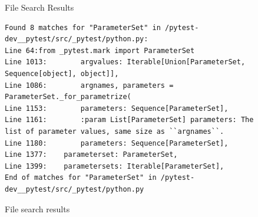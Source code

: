 \begin{figure}
\centering
\begin{fileviewerbox}{File Search Results}
\begin{Verbatim}[breaklines=true]
Found 8 matches for "ParameterSet" in /pytest-dev__pytest/src/_pytest/python.py:
Line 64:from _pytest.mark import ParameterSet
Line 1013:        argvalues: Iterable[Union[ParameterSet, Sequence[object], object]],
Line 1086:        argnames, parameters = ParameterSet._for_parametrize(
Line 1153:        parameters: Sequence[ParameterSet],
Line 1161:        :param List[ParameterSet] parameters: The list of parameter values, same size as ``argnames``.
Line 1180:        parameters: Sequence[ParameterSet],
Line 1377:    parameterset: ParameterSet,
Line 1399:    parametersets: Iterable[ParameterSet],
End of matches for "ParameterSet" in /pytest-dev__pytest/src/_pytest/python.py
\end{Verbatim}
\end{fileviewerbox}
\caption{File search results}
\label{fig:appx:file_search}
\end{figure}